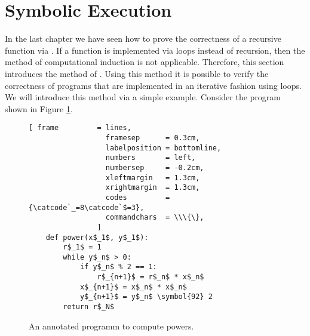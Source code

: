 \section{Symbolic Execution}
In the last chapter we have seen how to prove the correctness of a recursive function via
.  If a function is implemented via loops instead of recursion, then the method
of computational induction is not applicable.  Therefore, this section introduces the method of
.   Using this method it is possible to verify the
correctness of programs that are implemented in an iterative fashion using loops. 
We will introduce this method via a simple example.  Consider the program shown in Figure
\ref{fig:power-iterative-annotated.stlx}. 

\begin{figure}[!h]
\centering
\begin{Verbatim}[ frame         = lines, 
                  framesep      = 0.3cm, 
                  labelposition = bottomline,
                  numbers       = left,
                  numbersep     = -0.2cm,
                  xleftmargin   = 1.3cm,
                  xrightmargin  = 1.3cm,
                  codes         = {\catcode`_=8\catcode`$=3},
                  commandchars  = \\\{\},
                ]
    def power(x$_1$, y$_1$):
        r$_1$ = 1
        while y$_n$ > 0:
            if y$_n$ % 2 == 1:
                r$_{n+1}$ = r$_n$ * x$_n$
            x$_{n+1}$ = x$_n$ * x$_n$
            y$_{n+1}$ = y$_n$ \symbol{92} 2
        return r$_N$
\end{Verbatim}
\vspace*{-0.3cm}
\caption{An annotated programm to compute powers.}
\label{fig:power-iterative-annotated.stlx}
\end{figure} %

